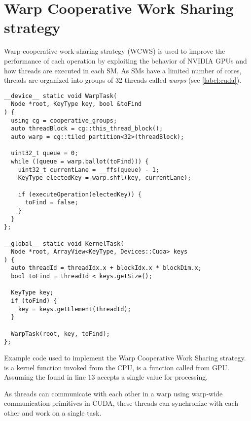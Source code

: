 \section{Warp Cooperative Work Sharing strategy}\label{section:wcws}

Warp-cooperative work-sharing strategy (WCWS) is used to improve the performance of each operation by exploiting the behavior of NVIDIA GPUs and how threads are executed in each SM. As SMs have a limited number of cores, threads are organized into groups of 32 threads called \textit{warps} (see \cref{label:cuda}).

\begin{listing}
  \begin{verbatim}
__device__ static void WarpTask(
  Node *root, KeyType key, bool &toFind
) {
  using cg = cooperative_groups;
  auto threadBlock = cg::this_thread_block();
  auto warp = cg::tiled_partition<32>(threadBlock);

  uint32_t queue = 0;
  while ((queue = warp.ballot(toFind))) {
    uint32_t currentLane = __ffs(queue) - 1;
    KeyType electedKey = warp.shfl(key, currentLane);

    if (executeOperation(electedKey)) {
      toFind = false;
    }
  }
};

__global__ static void KernelTask(
  Node *root, ArrayView<KeyType, Devices::Cuda> keys
) {
  auto threadId = threadIdx.x + blockIdx.x * blockDim.x;
  bool toFind = threadId < keys.getSize();

  KeyType key;
  if (toFind) {
    key = keys.getElement(threadId);
  }

  WarpTask(root, key, toFind);
};
  \end{verbatim}
  \caption{Example code used to implement the Warp Cooperative Work Sharing strategy.  is a kernel function invoked from the CPU,  is a function called from GPU. Assuming the  found in line 13 accepts a single value for processing.}
  \label{lst:wcws}
\end{listing}

As threads can communicate with each other in a warp using warp-wide communication primitives in CUDA, these threads can synchronize with each other and work on a single task.

